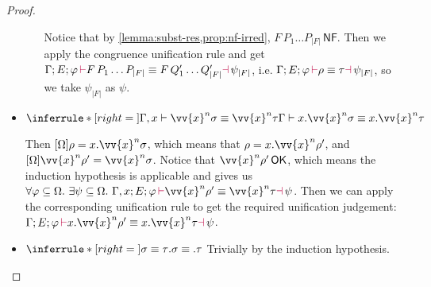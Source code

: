 \documentclass[a4,natbib=false]{article}
\newtheorem{lemma}{Lemma}
\newcommand{\ilyam}[1]{{\color{red} \texttt{Ilya:  #1}}}
\newcommand{\rename}[3]{{#1}\{{#2}\rightsquigarrow{#3}\}}
\newcommand{\ctxtapp}[2]{[{#1}] {#2}}
\newcommand{\narg}[1]{|{#1}|}
\newcommand{\judgeequivunt}[2]{{#1} \equiv {#2}}
\newcommand{\judgeequivuntg}[3]{{#1} \vdash {#2} \equiv {#3}}
\newcommand{\judgeunify}[4]{{#1}\,{\color{purple}\vdash} {#2} \equiv {#3} {\color{purple}\dashv}\,{#4}}
\newcommand{\judgeSnf}[1]{{#1}\,\mathsf{NF}}
\newcommand{\judgeSokterm}[1]{{#1} \,\mathsf{OK}}
\newcommand{\absclose}[2]{\vv{x}^{#1} #2}
\newcommand{\fullterm}[2]{{#1}\,#2_1 \dots #2_{\narg{#1}}}
\newcommand{\Infer}[3]{\inferrule*[right={#1}]{#2}{#3}}
\begin{document}
\begin{proof}
\begin{itemize}
\begin{itemize}
        Notice that by \cref{lemma:subst-res,prop:nf-irred},
        $\judgeSnf{\fullterm{F}{P}}$. Then we apply the congruence
        unification rule and get
        $\judgeunify{\Gamma; E;\varphi}{\fullterm{F}{P}}{\fullterm{F}{Q'}}{\psi_{\narg{F}}}$,
        i.e. $\judgeunify{\Gamma; E;\varphi}{\rho}{\tau}{\psi_{\narg{F}}}$, so we take
        $\psi_{\narg{F}}$ as $\psi$.

    \end{itemize}
    
  \item
    $
    \Infer{}
    {\judgeequivuntg{\Gamma, x}{\absclose{n}{\sigma}} {\absclose{n}{\tau}} }
    {\judgeequivuntg{\Gamma}{x.\absclose{n}{\sigma}}{x.\absclose{n}{\tau}}}
    $

    Then
    $\ctxtapp{\Omega}{\rho} = x.\absclose{n}{\sigma}$, which means that $\rho =
    x.\absclose{n}{\rho'}$, and  $\ctxtapp{\Omega}{\absclose{n}{\rho'}} =
    \absclose{n}{\sigma}$. Notice that
    $\judgeSokterm{\absclose{n}{\rho'}}$, which means the induction hypothesis
    is applicable and gives us $\forall \varphi \subseteq \Omega. ~ \exists \psi
    \subseteq \Omega. ~
    \judgeunify{\Gamma,x;E;\varphi}{\absclose{n}{\rho'}}{\absclose{n}{\tau}}{\psi}$.
    Then we can apply the corresponding
    unification rule to get the required unification judgement: 
    $\judgeunify{\Gamma; E; \varphi}{x.\absclose{n}{\rho'}}{x.\absclose{n}{\tau}}{\psi}$.

  \item
    $
    \Infer{}
    {
      \judgeequivunt{\sigma}{\tau}
    }
    {
      \judgeequivunt{.\sigma}{.\tau}
    }
    $
    Trivially by the induction hypothesis.
    
  \end{itemize}

\end{proof}



\end{document}
